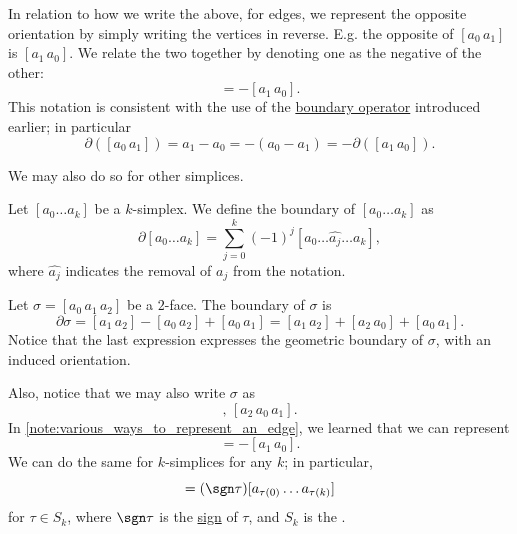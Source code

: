 \documentclass[notoc,notitlepage]{tufte-book}
\begin{document}
\begin{note}\label{note:various_ways_to_represent_an_edge}
  In relation to how we write the above, for edges, we represent the opposite
  orientation by simply writing the vertices in reverse. E.g. the opposite of
  $[a_0 \, a_1]$ is $[a_1 \, a_0]$. We relate the two together by denoting one as
  the negative of the other:
  \begin{equation*}
    [a_0 \, a_1] = - [a_1 \, a_0].
  \end{equation*}
  This notation is consistent with the use of the
  \hyperref[defn:boundary_of_an_edge]{boundary operator} introduced earlier; in
  particular
  \begin{equation*}
    \partial ([a_0 \, a_1]) = a_1 - a_0 = - (a_0 - a_1) = - \partial ([a_1 \,
    a_0]).
  \end{equation*}
\end{note}

We may also do so for other simplices.

\begin{defn}\label{defn:boundary_of_simplicies}
  Let $[a_0 \hdots a_k]$ be a $k$-simplex. We define the boundary of $[a_0
  \hdots a_k]$ as
  \begin{equation*}
    \partial[a_0 \hdots a_k] = \sum_{j=0}^{k} (-1)^j [a_0 \hdots \hat{a_j}
    \hdots a_k],
  \end{equation*}
  where $\hat{a_j}$ indicates the removal of $a_j$ from the notation.
\end{defn}

\begin{eg}
  Let $\sigma = [a_0 \, a_1 \, a_2]$ be a $2$-face. The boundary of $\sigma$ is
  \begin{equation*}
    \partial \sigma = [a_1 \, a_2] - [a_0 \, a_2] + [a_0 \, a_1]
    = [a_1 \, a_2] + [a_2 \, a_0] + [a_0 \, a_1].
  \end{equation*}
  Notice that the last expression expresses the geometric boundary of $\sigma$,
  with an induced orientation.

  Also, notice that we may also write $\sigma$ as
  \begin{equation*}
    [a_1 \, a_2 \, a_0], \, [a_2 \, a_0 \, a_1].
  \end{equation*}
  In \cref{note:various_ways_to_represent_an_edge}, we learned that we can
  represent
  \begin{equation*}
    [a_0 \, a_1] = - [a_1 \, a_0].
  \end{equation*}
  We can do the same for $k$-simplices for any $k$; in particular,
  \begin{equation*}
    [a_0 \, \hdots \, a_k] = (\sgn \tau) [a_{\tau(0)} \hdots a_{\tau(k)}]
  \end{equation*}
  for $\tau \in S_k$, where $\sgn \tau$ is the
  \href{https://en.wikipedia.org/wiki/Parity_of_a_permutation}{sign} of $\tau$,
  and $S_k$ is the .
\end{eg}
\end{document}
